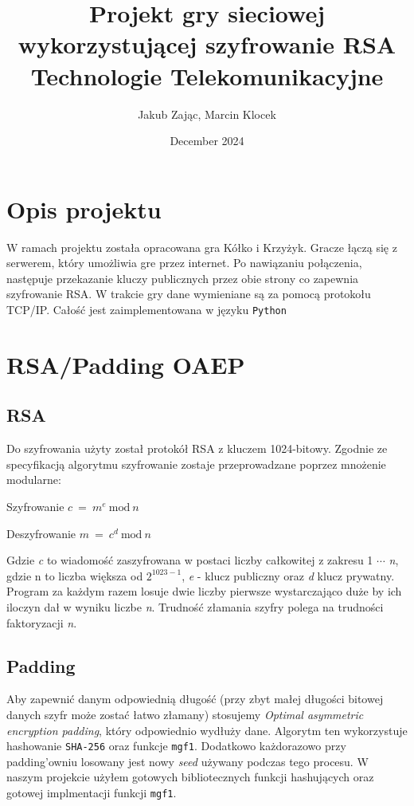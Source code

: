 \documentclass[a4paper,12pt]{article}
\title{
	Projekt gry sieciowej wykorzystującej szyfrowanie RSA \\
	Technologie Telekomunikacyjne}
\author{Jakub Zając, Marcin Klocek}
\date{December 2024}
\begin{document}
\maketitle

\section{Opis projektu}
W ramach projektu została opracowana gra Kółko i Krzyżyk.
Gracze łączą się z serwerem, który umożliwia gre przez internet.
Po nawiązaniu połączenia, następuje przekazanie kluczy publicznych przez
obie strony co zapewnia szyfrowanie RSA.
W trakcie gry dane wymieniane są za pomocą protokołu TCP/IP.
Całość jest zaimplementowana w języku \texttt{Python}

\section{RSA/Padding OAEP}
\subsection{RSA}
Do szyfrowania użyty został protokół RSA z kluczem 1024-bitowy.
Zgodnie ze specyfikacją algorytmu szyfrowanie zostaje przeprowadzane
poprzez mnożenie modularne: \newline

\begin{multicols}{2}
\begin{center}
\Large Szyfrowanie \newline
\Large $ c~=~m^e~\mathrm{mod} ~ n$
\end{center}
\vfill

\begin{center}
\Large Deszyfrowanie \newline
\Large $ m~=~c^d~\mathrm{mod} ~ n$
\end{center}
\vfill
\end{multicols}
Gdzie \textit{c} to wiadomość zaszyfrowana w postaci liczby
całkowitej z zakresu  1 $\cdots$ \textit{n}, gdzie n to
liczba większa od $2^{1023-1}$, \textit{e} - klucz publiczny
oraz \textit{d} klucz prywatny. Program za każdym razem losuje
dwie liczby pierwsze wystarczająco duże by ich iloczyn dał
w wyniku liczbe \textit{n}. Trudność złamania szyfry
polega na trudności faktoryzacji \textit{n}.

\newpage
\subsection{Padding}
Aby zapewnić danym odpowiednią długość (przy zbyt małej długości
bitowej danych szyfr może zostać łatwo złamany) stosujemy
\textit{Optimal asymmetric encryption padding}, który odpowiednio wydłuży dane.
Algorytm ten wykorzystuje hashowanie \texttt{SHA-256}  oraz funkcje \texttt{mgf1}.
Dodatkowo każdorazowo przy padding'owniu losowany jest nowy \textit{seed}
używany podczas tego procesu. W naszym projekcie użyłem gotowych
bibliotecznych funkcji hashujących oraz gotowej implmentacji funkcji \texttt{mgf1}.
\end{document}
